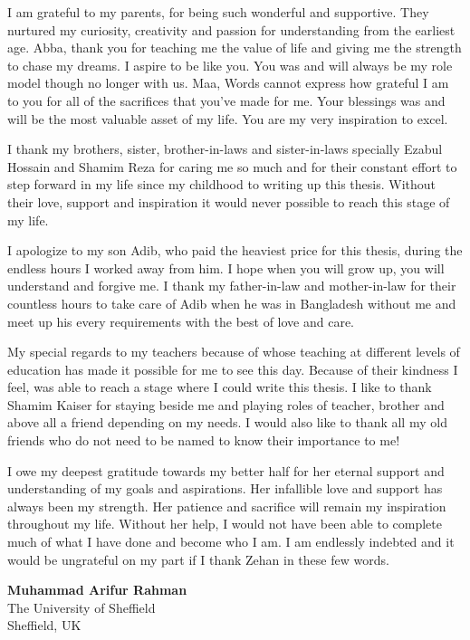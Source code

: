 \begin{acknowledgements}
I am grateful to my parents, for being such wonderful and supportive. They nurtured my curiosity, creativity and passion for understanding from the earliest age. Abba, thank you for teaching me the value of life and giving me the strength to chase my dreams. I aspire to be like you. You was and will always be my role model though no longer with us. Maa, Words cannot express how grateful I am to you for all of the sacrifices that you’ve made for me. Your blessings was and will be the most valuable asset of my life. You are my very inspiration to excel.  

I thank my brothers, sister, brother-in-laws and sister-in-laws specially Ezabul Hossain and Shamim Reza for caring me so much and for their constant effort to step forward in my life since my childhood to writing up this thesis. Without their love, support and inspiration it would never possible to reach this stage of my life. 

I apologize to my son Adib, who paid the heaviest price for this thesis, during the endless hours I worked away from him. I hope when you will grow up, you will understand and forgive me. I thank my father-in-law and mother-in-law for their countless hours to take care of Adib when he was in Bangladesh without me and meet up his every requirements with the best of love and care. 

My special regards to my teachers because of whose teaching at different levels of education has made it possible for me to see this day. Because of their kindness I feel, was able to reach a stage where I could write this thesis. I like to thank Shamim Kaiser for staying beside me and playing roles of teacher, brother and above all a friend depending on my needs. I would also like to thank all my old friends who do not need to be named to know their importance to me!

I owe my deepest gratitude towards my better half for her eternal support and understanding of my goals and aspirations. Her infallible love and support has always been my strength. Her patience and sacrifice will remain my inspiration throughout my life. Without her help, I would not have been able to complete much of what I have done and become who I am. I am endlessly indebted and it would be ungrateful on my part if I thank Zehan in these few words. \\


{\raggedleft
\textbf{Muhammad Arifur Rahman}\\
The University of Sheffield\\
Sheffield, UK\\
\date{\today}
}


\end{acknowledgements}
